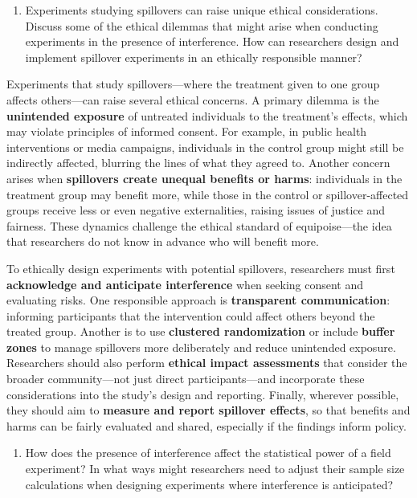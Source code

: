 \documentclass[
  letterpaper,
  DIV=11,
  numbers=noendperiod]{scrartcl}
\providecommand{\tightlist}{%
  \setlength{\itemsep}{0pt}\setlength{\parskip}{0pt}}\usepackage{longtable,booktabs,array}
\begin{document}
\begin{enumerate}
\def\labelenumi{\arabic{enumi}.}
\setcounter{enumi}{6}
\tightlist
\item
  Experiments studying spillovers can raise unique ethical
  considerations. Discuss some of the ethical dilemmas that might arise
  when conducting experiments in the presence of interference. How can
  researchers design and implement spillover experiments in an ethically
  responsible manner?
\end{enumerate}

Experiments that study spillovers---where the treatment given to one
group affects others---can raise several ethical concerns. A primary
dilemma is the \textbf{unintended exposure} of untreated individuals to
the treatment's effects, which may violate principles of informed
consent. For example, in public health interventions or media campaigns,
individuals in the control group might still be indirectly affected,
blurring the lines of what they agreed to. Another concern arises when
\textbf{spillovers create unequal benefits or harms}: individuals in the
treatment group may benefit more, while those in the control or
spillover-affected groups receive less or even negative externalities,
raising issues of justice and fairness. These dynamics challenge the
ethical standard of equipoise---the idea that researchers do not know in
advance who will benefit more.

To ethically design experiments with potential spillovers, researchers
must first \textbf{acknowledge and anticipate interference} when seeking
consent and evaluating risks. One responsible approach is
\textbf{transparent communication}: informing participants that the
intervention could affect others beyond the treated group. Another is to
use \textbf{clustered randomization} or include \textbf{buffer zones} to
manage spillovers more deliberately and reduce unintended exposure.
Researchers should also perform \textbf{ethical impact assessments} that
consider the broader community---not just direct participants---and
incorporate these considerations into the study's design and reporting.
Finally, wherever possible, they should aim to \textbf{measure and
report spillover effects}, so that benefits and harms can be fairly
evaluated and shared, especially if the findings inform policy.

\begin{enumerate}
\def\labelenumi{\arabic{enumi}.}
\setcounter{enumi}{7}
\tightlist
\item
  How does the presence of interference affect the statistical power of
  a field experiment? In what ways might researchers need to adjust
  their sample size calculations when designing experiments where
  interference is anticipated?
\end{enumerate}
\end{document}
